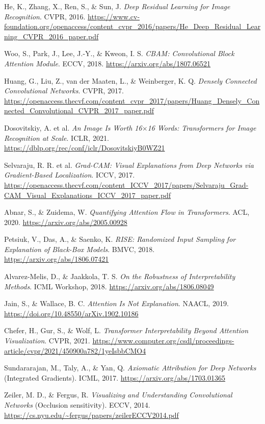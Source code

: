 \documentclass[11pt,a4paper]{article}
\begin{document}
\begin{list}{}{\setlength{\leftmargin}{2.5em}\setlength{\labelwidth}{2em}\setlength{\labelsep}{0.3em}\setlength{\itemsep}{0.2ex}}
\item[1.] He, K., Zhang, X., Ren, S., \& Sun, J. \emph{Deep Residual Learning for Image Recognition}. CVPR, 2016. \url{https://www.cv-foundation.org/openaccess/content_cvpr_2016/papers/He_Deep_Residual_Learning_CVPR_2016_paper.pdf}
\item[2.] Woo, S., Park, J., Lee, J.-Y., \& Kweon, I. S. \emph{CBAM: Convolutional Block Attention Module}. ECCV, 2018. \url{https://arxiv.org/abs/1807.06521}
\item[3.] Huang, G., Liu, Z., van der Maaten, L., \& Weinberger, K. Q. \emph{Densely Connected Convolutional Networks}. CVPR, 2017. \url{https://openaccess.thecvf.com/content_cvpr_2017/papers/Huang_Densely_Connected_Convolutional_CVPR_2017_paper.pdf}
\item[4.] Dosovitskiy, A. et al. \emph{An Image Is Worth 16$\times$16 Words: Transformers for Image Recognition at Scale}. ICLR, 2021. \url{https://dblp.org/rec/conf/iclr/DosovitskiyB0WZ21}
\item[5.] Selvaraju, R. R. et al. \emph{Grad-CAM: Visual Explanations from Deep Networks via Gradient-Based Localization}. ICCV, 2017. \url{https://openaccess.thecvf.com/content_ICCV_2017/papers/Selvaraju_Grad-CAM_Visual_Explanations_ICCV_2017_paper.pdf}
\item[6.] Abnar, S., \& Zuidema, W. \emph{Quantifying Attention Flow in Transformers}. ACL, 2020. \url{https://arxiv.org/abs/2005.00928}
\item[7.] Petsiuk, V., Das, A., \& Saenko, K. \emph{RISE: Randomized Input Sampling for Explanation of Black-Box Models}. BMVC, 2018. \url{https://arxiv.org/abs/1806.07421}
\item[8.] Alvarez-Melis, D., \& Jaakkola, T. S. \emph{On the Robustness of Interpretability Methods}. ICML Workshop, 2018. \url{https://arxiv.org/abs/1806.08049}
\item[9.] Jain, S., \& Wallace, B. C. \emph{Attention Is Not Explanation}. NAACL, 2019. \url{https://doi.org/10.48550/arXiv.1902.10186}
\item[10.] Chefer, H., Gur, S., \& Wolf, L. \emph{Transformer Interpretability Beyond Attention Visualization}. CVPR, 2021. \url{https://www.computer.org/csdl/proceedings-article/cvpr/2021/450900a782/1yeIsbbCMO4}
\item[11.] Sundararajan, M., Taly, A., \& Yan, Q. \emph{Axiomatic Attribution for Deep Networks} (Integrated Gradients). ICML, 2017. \url{https://arxiv.org/abs/1703.01365}
\item[12.] Zeiler, M. D., \& Fergus, R. \emph{Visualizing and Understanding Convolutional Networks} (Occlusion sensitivity). ECCV, 2014. \url{https://cs.nyu.edu/~fergus/papers/zeilerECCV2014.pdf}
\end{list}
\end{document}
